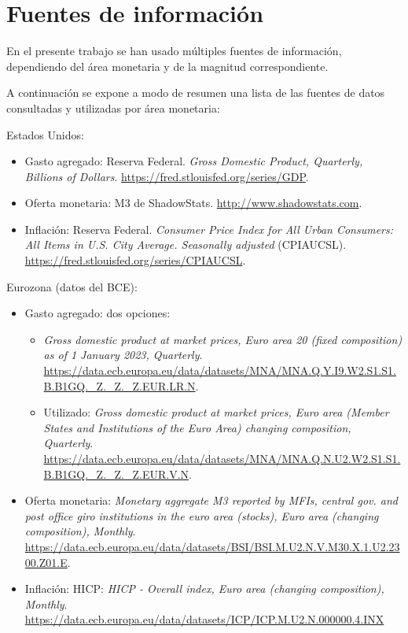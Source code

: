 \section{Fuentes de información}\label{fuentes-de-informacion}

En el presente trabajo se han usado múltiples fuentes de información, dependiendo del área monetaria y de la magnitud correspondiente.

A continuación se expone a modo de resumen una lista de las fuentes de datos consultadas y utilizadas por área monetaria:

Estados Unidos:
\begin{itemize}
  \item Gasto agregado: Reserva Federal. \textit{Gross Domestic Product, Quarterly, Billions of Dollars}. \url{https://fred.stlouisfed.org/series/GDP}.
  \item Oferta monetaria: M3 de ShadowStats. \url{http://www.shadowstats.com}.
  \item Inflación: Reserva Federal. \textit{Consumer Price Index for All Urban Consumers: All Items in U.S. City Average. Seasonally adjusted} (CPIAUCSL). \url{https://fred.stlouisfed.org/series/CPIAUCSL}.
\end{itemize}

Eurozona (datos del BCE):
\begin{itemize}
  \item Gasto agregado: dos opciones:
        \begin{itemize}
          \item \textit{Gross domestic product at market prices, Euro area 20 (fixed composition) as of 1 January 2023, Quarterly}. \url{https://data.ecb.europa.eu/data/datasets/MNA/MNA.Q.Y.I9.W2.S1.S1.B.B1GQ._Z._Z._Z.EUR.LR.N}.
          \item Utilizado: \textit{Gross domestic product at market prices, Euro area (Member States and Institutions of the Euro Area) changing composition, Quarterly}. \url{https://data.ecb.europa.eu/data/datasets/MNA/MNA.Q.N.U2.W2.S1.S1.B.B1GQ._Z._Z._Z.EUR.V.N}.
        \end{itemize}
  \item Oferta monetaria: \textit{Monetary aggregate M3 reported by MFIs, central gov. and post office giro institutions in the euro area (stocks), Euro area (changing composition), Monthly}. \url{https://data.ecb.europa.eu/data/datasets/BSI/BSI.M.U2.N.V.M30.X.1.U2.2300.Z01.E}.
  \item Inflación: HICP: \textit{HICP - Overall index, Euro area (changing composition), Monthly}. \url{https://data.ecb.europa.eu/data/datasets/ICP/ICP.M.U2.N.000000.4.INX}
\end{itemize}

